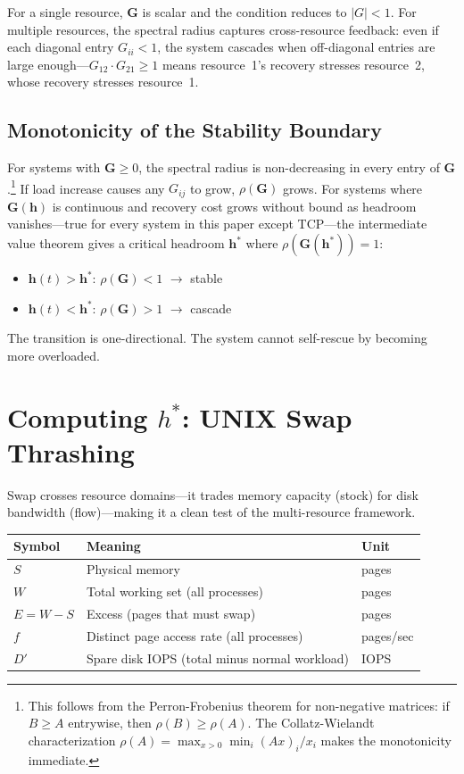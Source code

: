 \documentclass[11pt]{article}
\begin{document}
For a single resource, $\mathbf{G}$ is scalar and the condition reduces to
$|G| < 1$. For multiple resources, the spectral radius captures cross-resource
feedback: even if each diagonal entry $G_{ii} < 1$, the system cascades when
off-diagonal entries are large enough---$G_{12} \cdot G_{21} \geq 1$ means
resource~1's recovery stresses resource~2, whose recovery stresses resource~1.

\subsection{Monotonicity of the Stability Boundary}

For systems with $\mathbf{G} \geq 0$, the spectral radius is non-decreasing in
every entry of $\mathbf{G}$.\footnote{This follows from the Perron-Frobenius
theorem for non-negative matrices: if $B \geq A$ entrywise, then
$\rho(B) \geq \rho(A)$. The Collatz-Wielandt characterization
$\rho(A) = \max_{x > 0} \min_i (Ax)_i / x_i$ makes the monotonicity immediate.}
If load increase causes any $G_{ij}$ to grow, $\rho(\mathbf{G})$ grows. For
systems where $\mathbf{G}(\mathbf{h})$ is continuous and recovery cost grows
without bound as headroom vanishes---true for every system in this paper except
TCP---the intermediate value theorem gives a critical headroom $\mathbf{h}^*$
where $\rho(\mathbf{G}(\mathbf{h}^*)) = 1$:

\begin{itemize}
  \item $\mathbf{h}(t) > \mathbf{h}^*$: $\rho(\mathbf{G}) < 1$ $\to$ stable
  \item $\mathbf{h}(t) < \mathbf{h}^*$: $\rho(\mathbf{G}) > 1$ $\to$ cascade
\end{itemize}

The transition is one-directional. The system cannot self-rescue by becoming more
overloaded.

\section{Computing $h^*$: UNIX Swap Thrashing}
\label{sec:swap}

Swap crosses resource domains---it trades memory capacity (stock) for disk
bandwidth (flow)---making it a clean test of the multi-resource framework.

\begin{center}
\begin{tabular}{@{}lll@{}}
\toprule
Symbol & Meaning & Unit \\
\midrule
$S$ & Physical memory & pages \\
$W$ & Total working set (all processes) & pages \\
$E = W - S$ & Excess (pages that must swap) & pages \\
$f$ & Distinct page access rate (all processes) & pages/sec \\
$D'$ & Spare disk IOPS (total minus normal workload) & IOPS \\
\bottomrule
\end{tabular}
\end{center}
\end{document}
